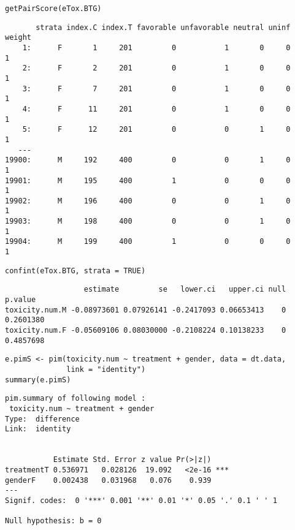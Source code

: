 \documentclass[12pt]{article}
\begin{document}
\lstset{language=r,label= ,caption= ,captionpos=b,numbers=none}
\begin{lstlisting}
getPairScore(eTox.BTG)
\end{lstlisting}

\begin{verbatim}
       strata index.C index.T favorable unfavorable neutral uninf weight
    1:      F       1     201         0           1       0     0      1
    2:      F       2     201         0           1       0     0      1
    3:      F       7     201         0           1       0     0      1
    4:      F      11     201         0           1       0     0      1
    5:      F      12     201         0           0       1     0      1
   ---                                                                  
19900:      M     192     400         0           0       1     0      1
19901:      M     195     400         1           0       0     0      1
19902:      M     196     400         0           0       1     0      1
19903:      M     198     400         0           0       1     0      1
19904:      M     199     400         1           0       0     0      1
\end{verbatim}


\lstset{language=r,label= ,caption= ,captionpos=b,numbers=none}
\begin{lstlisting}
confint(eTox.BTG, strata = TRUE)
\end{lstlisting}

\begin{verbatim}
                  estimate         se   lower.ci   upper.ci null   p.value
toxicity.num.M -0.08973601 0.07926141 -0.2417093 0.06653413    0 0.2601380
toxicity.num.F -0.05609106 0.08030000 -0.2108224 0.10138233    0 0.4857698
\end{verbatim}


\lstset{language=r,label= ,caption= ,captionpos=b,numbers=none}
\begin{lstlisting}
e.pimS <- pim(toxicity.num ~ treatment + gender, data = dt.data,
              link = "identity")
summary(e.pimS)
\end{lstlisting}

\begin{verbatim}
pim.summary of following model : 
 toxicity.num ~ treatment + gender
Type:  difference 
Link:  identity 


           Estimate Std. Error z value Pr(>|z|)    
treatmentT 0.536971   0.028126  19.092   <2e-16 ***
genderF    0.002438   0.031968   0.076    0.939    
---
Signif. codes:  0 '***' 0.001 '**' 0.01 '*' 0.05 '.' 0.1 ' ' 1

Null hypothesis: b = 0
\end{verbatim}
\end{document}
